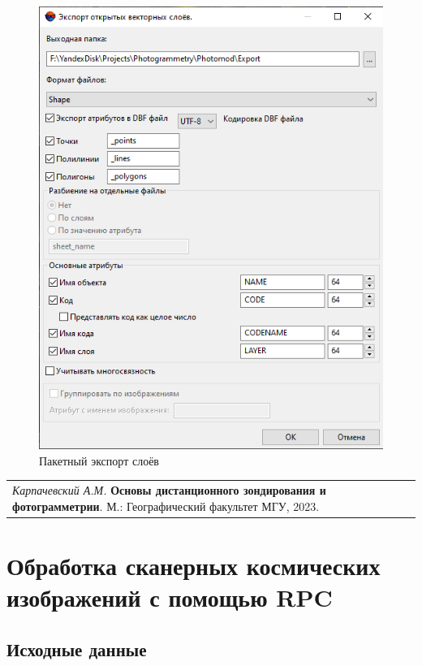 \documentclass[
  12pt,
]{book}
\begin{document}
\begin{figure}
\centering
\includegraphics{images/Ref16/Export.png}
\caption{Пакетный экспорт слоёв}
\end{figure}

\begin{longtable}[]{@{}l@{}}
\toprule\noalign{}
\endhead
\bottomrule\noalign{}
\endlastfoot
\emph{Карпачевский А.М.} \textbf{Основы дистанционного зондирования и фотограмметрии}. М.: Географический факультет МГУ, 2023. \\
\end{longtable}

\hypertarget{rpc}{%
\chapter{Обработка сканерных космических изображений с помощью RPC}\label{rpc}}

\hypertarget{rpc-initial}{%
\section{Исходные данные}\label{rpc-initial}}
\end{document}
